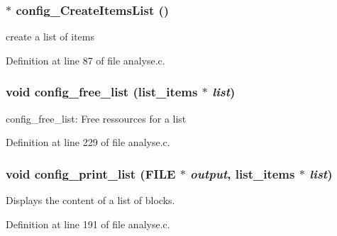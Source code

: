 \subsubsection[{config\_\-CreateItemsList}]{$\ast$ config\_\-CreateItemsList ()}\label{analyse_8h_b9e49c47a113c09943b6afebde940857}


create a list of items 

Definition at line 87 of file analyse.c.
\subsubsection[{config\_\-free\_\-list}]{\setlength{\rightskip}{0pt plus 5cm}void config\_\-free\_\-list ({\bf list\_\-items} $\ast$ {\em list})}\label{analyse_8h_dc8ddb7f244c0bb2aeb9af15ebd3545c}


config\_\-free\_\-list: Free ressources for a list 

Definition at line 229 of file analyse.c.
\subsubsection[{config\_\-print\_\-list}]{\setlength{\rightskip}{0pt plus 5cm}void config\_\-print\_\-list (FILE $\ast$ {\em output}, \/  {\bf list\_\-items} $\ast$ {\em list})}\label{analyse_8h_11266361714a3c55a0d585dd118aaec5}


Displays the content of a list of blocks. 

Definition at line 191 of file analyse.c.